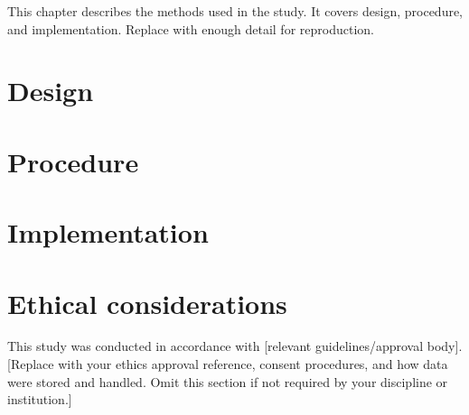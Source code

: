 %

This chapter describes the methods used in the study. It covers design, procedure, and implementation. Replace with enough detail for reproduction.

\lipsum[11-14]

\section{Design}\label{sec:methods-design}

\lipsum[15-17]

\section{Procedure}\label{sec:methods-procedure}

\lipsum[18-20]

\section{Implementation}\label{sec:methods-impl}

\lipsum[21-22]

\section{Ethical considerations}\label{sec:methods-ethics}
This study was conducted in accordance with [relevant guidelines/approval body]. [Replace with your ethics approval reference, consent procedures, and how data were stored and handled. Omit this section if not required by your discipline or institution.]
